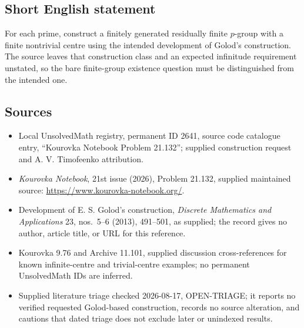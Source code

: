 \documentclass[11pt]{article}
\begin{document}
\subsection{Short English statement}
For each prime, construct a finitely generated residually finite $p$-group with a finite nontrivial centre using the intended development of Golod's construction. The source leaves that construction class and an expected infinitude requirement unstated, so the bare finite-group existence question must be distinguished from the intended one.
\subsection{Sources}
\begin{itemize}
\item Local UnsolvedMath registry, permanent ID 2641, source code catalogue entry, ``Kourovka Notebook Problem 21.132''; supplied construction request and A. V. Timofeenko attribution.
\item \emph{Kourovka Notebook}, 21st issue (2026), Problem 21.132, supplied maintained source: \url{https://www.kourovka-notebook.org/}.
\item Development of E. S. Golod's construction, \emph{Discrete Mathematics and Applications} 23, nos.~5--6 (2013), 491--501, as supplied; the record gives no author, article title, or URL for this reference.
\item Kourovka 9.76 and Archive 11.101, supplied discussion cross-references for known infinite-centre and trivial-centre examples; no permanent UnsolvedMath IDs are inferred.
\item Supplied literature triage checked 2026-08-17, OPEN-TRIAGE; it reports no verified requested Golod-based construction, records no source alteration, and cautions that dated triage does not exclude later or unindexed results.
\end{itemize}
\end{document}
